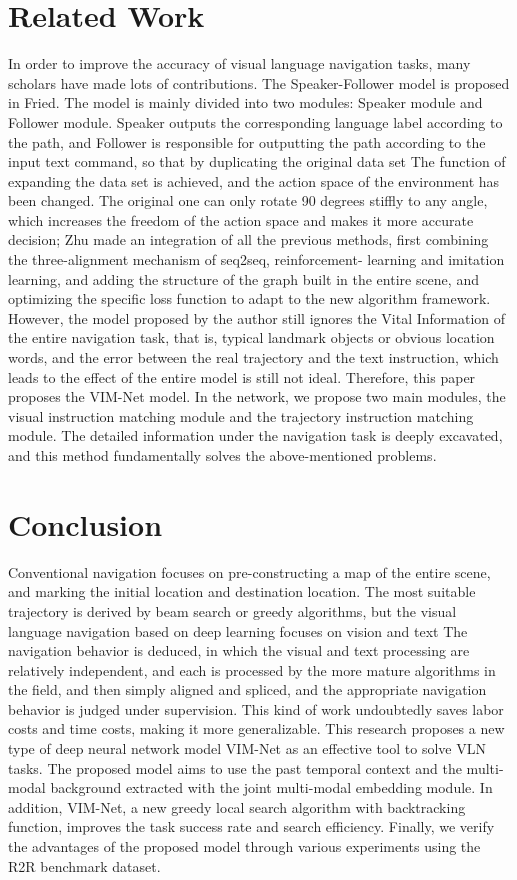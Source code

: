 \section{Related Work}
In order to improve the accuracy of visual language navigation tasks, many scholars \cite{fried2018speaker,hwang2021joint,majumdar2020improving,ma2019regretful,wang2019reinforced,zhu2020vision} have made lots of contributions. The Speaker-Follower model is proposed in Fried. The model is mainly divided into two modules: Speaker module and Follower module. Speaker outputs the corresponding language label according to the path, and Follower is responsible for outputting the path according to the input text command, so that by duplicating the original data set The function of expanding the data set is achieved, and the action space of the environment has been changed. The original one can only rotate 90 degrees stiffly to any angle, which increases the freedom of the action space and makes it more accurate decision; Zhu made an integration of all the previous methods, first combining the three-alignment mechanism of seq2seq, reinforcement- learning and imitation learning, and adding the structure of the graph built in the entire scene, and optimizing the specific loss function to adapt to the new algorithm framework. However, the model proposed by the author still ignores the Vital Information of the entire navigation task, that is, typical landmark objects or obvious location words, and the error between the real trajectory and the text instruction, which leads to the effect of the entire model is still not ideal. Therefore, this paper proposes the VIM-Net model. In the network, we propose two main modules, the visual instruction matching module and the trajectory instruction matching module. The detailed information under the navigation task is deeply excavated, and this method fundamentally solves the above-mentioned problems.

\section{Conclusion}
Conventional navigation focuses on pre-constructing a map of the entire scene, and marking the initial location and destination location. The most suitable trajectory is derived by beam search or greedy algorithms, but the visual language navigation based on deep learning focuses on vision and text The navigation behavior is deduced, in which the visual and text processing are relatively independent, and each is processed by the more mature algorithms in the field, and then simply aligned and spliced, and the appropriate navigation behavior is judged under supervision. This kind of work undoubtedly saves labor costs and time costs, making it more generalizable. This research proposes a new type of deep neural network model VIM-Net as an effective tool to solve VLN tasks. The proposed model aims to use the past temporal context and the multi-modal background extracted with the joint multi-modal embedding module. In addition, VIM-Net, a new greedy local search algorithm with backtracking function, improves the task success rate and search efficiency. Finally, we verify the advantages of the proposed model through various experiments using the R2R benchmark dataset.
	
